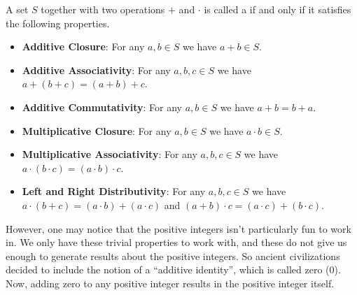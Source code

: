 \newpage

\begin{definition}
    A set $S$ together with two operations $+$ and $\cdot$ is called a  if and only if it satisfies the following properties.
    \begin{itemize}
        \item \textbf{Additive Closure}: For any $a, b \in S$ we have $a + b \in S$.
        \item \textbf{Additive Associativity}: For any $a, b, c \in S$ we have $a+(b+c) = (a+b)+c$.
        \item \textbf{Additive Commutativity}: For any $a, b \in S$ we have $a + b = b + a$.
        \item \textbf{Multiplicative Closure}: For any $a, b \in S$ we have $a \cdot b \in S$.
        \item \textbf{Multiplicative Associativity}: For any $a, b, c \in S$ we have $a\cdot(b\cdot c) = (a\cdot b)\cdot c$.
        \item \textbf{Left and Right Distributivity}: For any $a, b, c \in S$ we have $a\cdot(b + c) = (a \cdot b) + (a \cdot c)$ and $(a + b) \cdot c = (a \cdot c) + (b \cdot c)$.
    \end{itemize}
\end{definition}

However, one may notice that the positive integers isn't particularly fun to work in. We only have these trivial properties to work with, and these do not give us enough to generate results about the positive integers. So ancient civilizations decided to include the notion of a ``additive identity'', which is called zero (0). Now, adding zero to any positive integer results in the positive integer itself.

